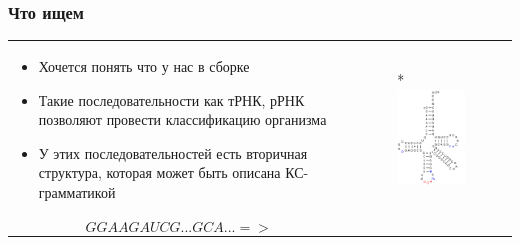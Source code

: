 \documentclass{beamer}
\begin{document}
    \begin{frame}
        \frametitle{Что ищем}
        \begin{tabular}{p{6cm} p{5cm}}
            \begin{itemize}
                \item Хочется понять что у нас в сборке
                \item Такие последовательности как тРНК, рРНК позволяют провести классификацию организма
                \item У этих последовательностей есть вторичная структура, которая может быть описана КС-грамматикой
            \end{itemize}
            &
            \begin{figure}[b]
                \centering
                \multirow{-3}*{\includegraphics[width=5.2cm]{pictures/TRNA.png}}
            \end{figure}
            \\
            $$
            GGAAGAUCG...GCA...  =>
            $$
            &
        \end{tabular}  
    \end{frame}
    
\end{document}
